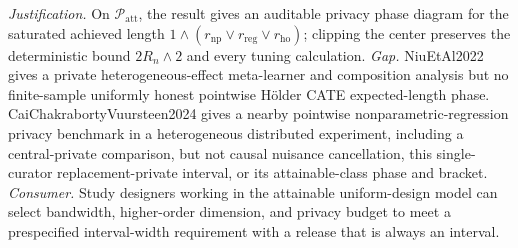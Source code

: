 \documentclass{article}
\begin{document}
\par\smallskip\noindent \textit{Justification.} On \(\mathcal P_{\mathrm{att}}\), the result gives an auditable privacy phase diagram for the saturated achieved length \(1\wedge(r_{\mathrm{np}}\vee r_{\mathrm{reg}}\vee r_{\mathrm{ho}})\); clipping the center preserves the deterministic bound \(2R_n\wedge2\) and every tuning calculation. \textit{Gap.} NiuEtAl2022 gives a private heterogeneous-effect meta-learner and composition analysis but no finite-sample uniformly honest pointwise H\"older CATE expected-length phase.  CaiChakrabortyVuursteen2024 gives a nearby pointwise nonparametric-regression privacy benchmark in a heterogeneous distributed experiment, including a central-private comparison, but not causal nuisance cancellation, this single-curator replacement-private interval, or its attainable-class phase and bracket. \textit{Consumer.} Study designers working in the attainable uniform-design model can select bandwidth, higher-order dimension, and privacy budget to meet a prespecified interval-width requirement with a release that is always an interval.
\end{document}
